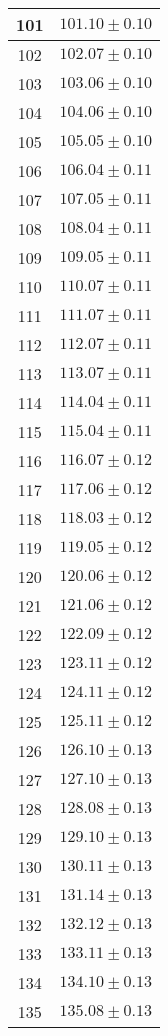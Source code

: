 \documentclass[prb,12pt]{revtex4-2}
\theoremstyle{definition}
\theoremstyle{definition}
\begin{document}
\begin{longtable}{cc}
	101 & $101.10\pm 0.10$ \\\midrule
	102 & $102.07\pm 0.10$ \\\midrule
	103 & $103.06\pm 0.10$ \\\midrule
	104 & $104.06\pm 0.10$ \\\midrule
	105 & $105.05\pm 0.10$ \\\midrule
	106 & $106.04\pm 0.11$ \\\midrule
	107 & $107.05\pm 0.11$ \\\midrule
	108 & $108.04\pm 0.11$ \\\midrule
	109 & $109.05\pm 0.11$ \\\midrule
	110 & $110.07\pm 0.11$ \\\midrule
	111 & $111.07\pm 0.11$ \\\midrule
	112 & $112.07\pm 0.11$ \\\midrule
	113 & $113.07\pm 0.11$ \\\midrule
	114 & $114.04\pm 0.11$ \\\midrule
	115 & $115.04\pm 0.11$ \\\midrule
	116 & $116.07\pm 0.12$ \\\midrule
	117 & $117.06\pm 0.12$ \\\midrule
	118 & $118.03\pm 0.12$ \\\midrule
	119 & $119.05\pm 0.12$ \\\midrule
	120 & $120.06\pm 0.12$ \\\midrule
	121 & $121.06\pm 0.12$ \\\midrule
	122 & $122.09\pm 0.12$ \\\midrule
	123 & $123.11\pm 0.12$ \\\midrule
	124 & $124.11\pm 0.12$ \\\midrule
	125 & $125.11\pm 0.12$ \\\midrule
	126 & $126.10\pm 0.13$ \\\midrule
	127 & $127.10\pm 0.13$ \\\midrule
	128 & $128.08\pm 0.13$ \\\midrule
	129 & $129.10\pm 0.13$ \\\midrule
	130 & $130.11\pm 0.13$ \\\midrule
	131 & $131.14\pm 0.13$ \\\midrule
	132 & $132.12\pm 0.13$ \\\midrule
	133 & $133.11\pm 0.13$ \\\midrule
	134 & $134.10\pm 0.13$ \\\midrule
	135 & $135.08\pm 0.13$ \\\midrule

\end{longtable}
\end{document}
